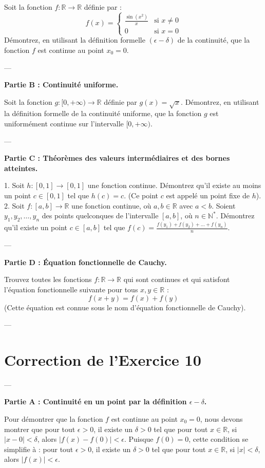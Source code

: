 \documentclass[12pt,a4paper]{report}
\begin{document}
Soit la fonction $f: \mathbb{R} \to \mathbb{R}$ définie par :
$$ f(x) = \begin{cases} \frac{\sin(x^2)}{x} & \text{si } x \neq 0 \\ 0 & \text{si } x = 0 \end{cases} $$
Démontrez, en utilisant la définition formelle $(\epsilon-\delta)$ de la continuité, que la fonction $f$ est continue au point $x_0 = 0$.

---

\textbf{Partie B : Continuité uniforme.}

Soit la fonction $g: [0, +\infty) \to \mathbb{R}$ définie par $g(x) = \sqrt{x}$.
Démontrez, en utilisant la définition formelle de la continuité uniforme, que la fonction $g$ est uniformément continue sur l'intervalle $[0, +\infty)$.

---

\textbf{Partie C : Théorèmes des valeurs intermédiaires et des bornes atteintes.}

1.  Soit $h: [0,1] \to [0,1]$ une fonction continue. Démontrez qu'il existe au moins un point $c \in [0,1]$ tel que $h(c) = c$. (Ce point $c$ est appelé un point fixe de $h$).
2.  Soit $f: [a,b] \to \mathbb{R}$ une fonction continue, où $a, b \in \mathbb{R}$ avec $a < b$. Soient $y_1, y_2, \dots, y_n$ des points quelconques de l'intervalle $[a,b]$, où $n \in \mathbb{N}^*$. Démontrez qu'il existe un point $c \in [a,b]$ tel que $f(c) = \frac{f(y_1) + f(y_2) + \dots + f(y_n)}{n}$.

---

\textbf{Partie D : Équation fonctionnelle de Cauchy.}

Trouvez toutes les fonctions $f: \mathbb{R} \to \mathbb{R}$ qui sont continues et qui satisfont l'équation fonctionnelle suivante pour tous $x, y \in \mathbb{R}$ :
$$ f(x+y) = f(x) + f(y) $$
(Cette équation est connue sous le nom d'équation fonctionnelle de Cauchy).

---

\section{Correction de l'Exercice 10}

---

\textbf{Partie A : Continuité en un point par la définition $\epsilon-\delta$.}

Pour démontrer que la fonction $f$ est continue au point $x_0 = 0$, nous devons montrer que pour tout $\epsilon > 0$, il existe un $\delta > 0$ tel que pour tout $x \in \mathbb{R}$, si $|x - 0| < \delta$, alors $|f(x) - f(0)| < \epsilon$.
Puisque $f(0) = 0$, cette condition se simplifie à : pour tout $\epsilon > 0$, il existe un $\delta > 0$ tel que pour tout $x \in \mathbb{R}$, si $|x| < \delta$, alors $|f(x)| < \epsilon$.
\end{document}
